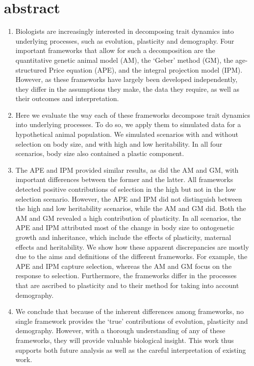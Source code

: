 \section{abstract}
\noindent \begin{enumerate}
\item Biologists are increasingly interested in decomposing trait dynamics into underlying processes, such as evolution, plasticity and demography. Four important frameworks that allow for such a decomposition are the quantitative genetic animal model (AM), the `Geber' method (GM), the age-structured Price equation (APE), and the integral projection model (IPM). However, as these frameworks have largely been developed independently, they differ in the assumptions they make, the data they require, as well as their outcomes and interpretation. 
\item Here we evaluate the way each of these frameworks decompose trait dynamics into underlying processes. To do so, we apply them to simulated data for a hypothetical animal population. We simulated scenarios with and without selection on body size, and with high and low heritability. In all four scenarios, body size also contained a plastic component.
\item The APE and IPM provided similar results, as did the AM and GM, with important differences between the former and the latter. All frameworks detected positive contributions of selection in the high but not in the low selection scenario. However, the APE and IPM did not distinguish between the high and low heritability scenarios, while the AM and GM did. Both the AM and GM revealed a high contribution of plasticity. In all scenarios, the APE and IPM attributed most of the change in body size to ontogenetic growth and inheritance, which include the effects of plasticity, maternal effects and heritability. We show how these apparent discrepancies are mostly due to the aims and definitions of the different frameworks. For example, the APE and IPM capture selection, whereas the AM and GM focus on the response to selection. Furthermore, the frameworks differ in the processes that are ascribed to plasticity and to their method for taking into account demography.
\item We conclude that because of the inherent differences among frameworks, no single framework provides the `true' contributions of evolution, plasticity and demography. However, with a thorough understanding of any of these frameworks, they will provide valuable biological insight. This work thus supports both future analysis as well as the careful interpretation of existing work.

\end{enumerate}

